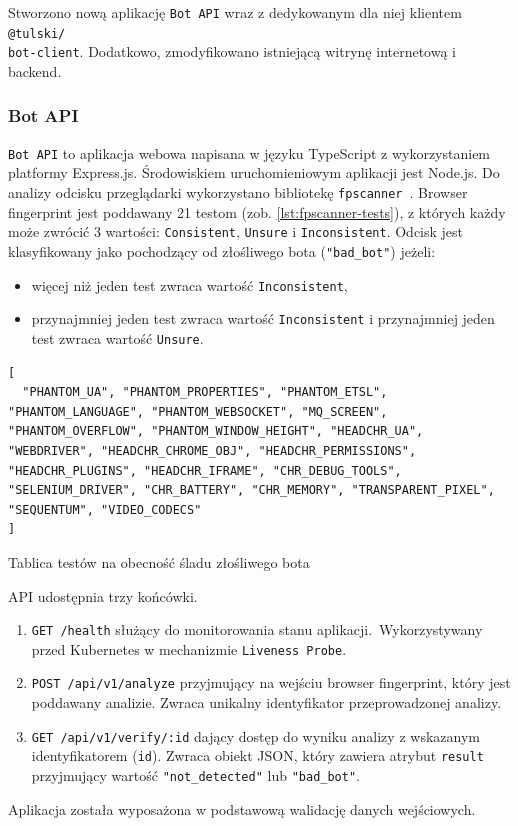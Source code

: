 Stworzono nową aplikację \texttt{Bot API} wraz z dedykowanym dla niej klientem \texttt{@tulski/\\bot-client}.
Dodatkowo, zmodyfikowano istniejącą witrynę internetową i backend.

\subsubsection{Bot API}

\texttt{Bot API} to aplikacja webowa napisana w języku TypeScript z wykorzystaniem platformy Express.js.
Środowiskiem uruchomieniowym aplikacji jest Node.js.
Do analizy odcisku przeglądarki wykorzystano bibliotekę \texttt{fpscanner}~\cite{github-fpscanner}.
Browser fingerprint jest poddawany 21 testom (zob. \autoref{lst:fpscanner-tests}), z których każdy
może zwrócić 3 wartości: \texttt{Consistent}, \texttt{Unsure} i \texttt{Inconsistent}.
Odcisk jest klasyfikowany jako pochodzący od złośliwego bota (\texttt{"bad\_bot"}) jeżeli:
\begin{itemize}
    \item więcej niż jeden test zwraca wartość \texttt{Inconsistent},
    \item przynajmniej jeden test zwraca wartość \texttt{Inconsistent} i przynajmniej jeden test zwraca wartość \texttt{Unsure}.
\end{itemize}

\begin{listing}[H]
    \begin{verbatim}
[
  "PHANTOM_UA", "PHANTOM_PROPERTIES", "PHANTOM_ETSL", "PHANTOM_LANGUAGE", "PHANTOM_WEBSOCKET", "MQ_SCREEN", "PHANTOM_OVERFLOW", "PHANTOM_WINDOW_HEIGHT", "HEADCHR_UA", "WEBDRIVER", "HEADCHR_CHROME_OBJ", "HEADCHR_PERMISSIONS", "HEADCHR_PLUGINS", "HEADCHR_IFRAME", "CHR_DEBUG_TOOLS", "SELENIUM_DRIVER", "CHR_BATTERY", "CHR_MEMORY", "TRANSPARENT_PIXEL", "SEQUENTUM", "VIDEO_CODECS"
]
    \end{verbatim}
    \caption{Tablica testów na obecność śladu złośliwego bota}
    \label{lst:fpscanner-tests}
\end{listing}


API udostępnia trzy końcówki.
\begin{enumerate}
    \item \texttt{GET /health} służący do monitorowania stanu aplikacji.\ Wykorzystywany przed Kubernetes w mechanizmie \texttt{Liveness Probe}.
    \item \texttt{POST /api/v1/analyze} przyjmujący na wejściu browser fingerprint, który jest poddawany analizie.
    Zwraca unikalny identyfikator przeprowadzonej analizy.
    \item \texttt{GET /api/v1/verify/:id} dający dostęp do wyniku analizy z wskazanym identyfikatorem (\texttt{id}).
    Zwraca obiekt JSON, który zawiera atrybut \texttt{result} przyjmujący wartość \texttt{"not\_detected"} lub \texttt{"bad\_bot"}.

\end{enumerate}
\noindent Aplikacja została wyposażona w podstawową walidację danych wejściowych.


